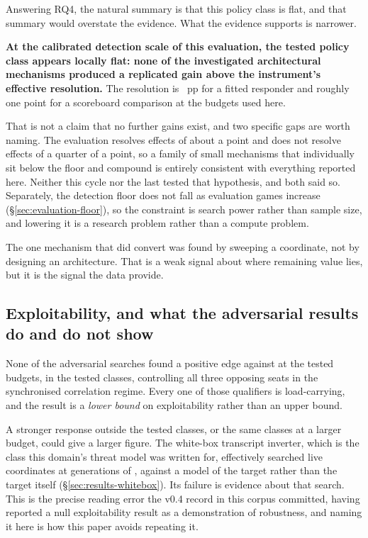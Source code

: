 Answering RQ4, the natural summary is that this policy class is flat, and that summary would overstate
the evidence. What the evidence supports is narrower.

\textbf{At the calibrated detection scale of this evaluation, the tested policy class appears locally
flat: none of the investigated architectural mechanisms produced a replicated gain above the
instrument's effective resolution.} The resolution is \vsevenPrimaryFloor{}~pp for a fitted responder
and roughly one point for a scoreboard comparison at the budgets used here.

That is not a claim that no further gains exist, and two specific gaps are worth naming. The
evaluation resolves effects of about a point and does not resolve effects of a quarter of a point, so
a family of small mechanisms that individually sit below the floor and compound is entirely
consistent with everything reported here. Neither this cycle nor the last tested that hypothesis, and
both said so. Separately, the detection floor does not fall as evaluation games increase
(\S\ref{sec:evaluation-floor}), so the constraint is search power rather than sample size, and
lowering it is a research problem rather than a compute problem.

The one mechanism that did convert was found by sweeping a coordinate, not by designing an
architecture. That is a weak signal about where remaining value lies, but it is the signal the data
provide.

\subsection{Exploitability, and what the adversarial results do and do not show}
\label{sec:discussion-exploit}

None of the \vsevenBfourArmsWord{} adversarial searches found a positive edge against \sestina{} at the
tested budgets, in the tested classes, controlling all three opposing seats in the synchronised
correlation regime. Every one of those qualifiers is load-carrying, and the result is a \emph{lower
bound} on exploitability rather than an upper bound.

A stronger response outside the tested classes, or the same classes at a larger budget, could give a
larger figure. The white-box transcript inverter, which is the class this domain's threat model was
written for, effectively searched \vsevenZeightLive{} live coordinates at \vsevenBfourGens{}
generations of \vsevenBfourPop{}, against a \vsix{} model of the target rather than the target
itself (\S\ref{sec:results-whitebox}). Its failure is evidence about that search. This is the precise
reading error the v0.4 record in this corpus committed, having reported a null exploitability result
as a demonstration of robustness, and naming it here is how this paper avoids repeating it.

